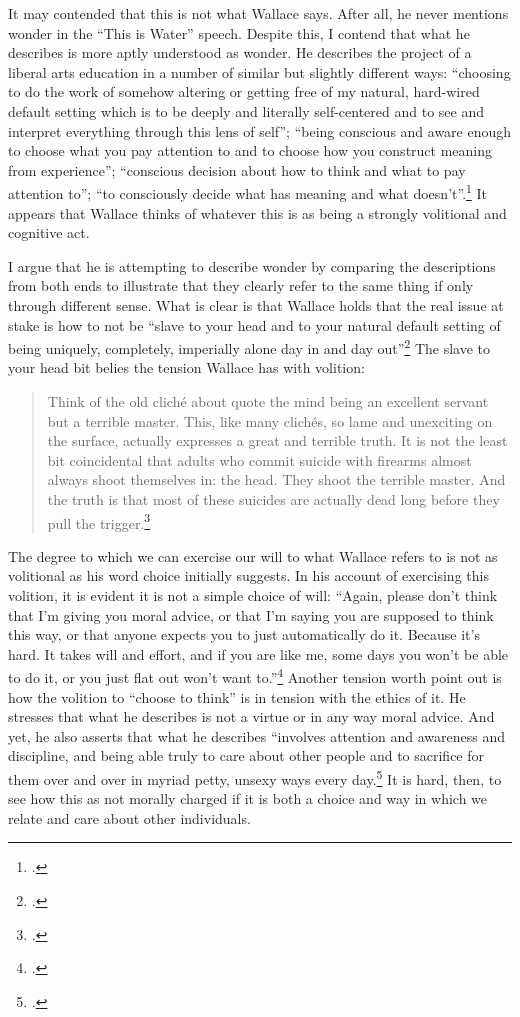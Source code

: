 \documentclass[letterpaper,notitlepage,12pt]{article}
\begin{document}
It may contended that this is not what Wallace says.
After all, he never mentions wonder in the ``This is Water'' speech.
Despite this, I contend that what he describes is more aptly understood as
wonder.
He describes the project of a liberal arts education in a number of similar but
slightly different ways: ``choosing to do the work of somehow altering
or getting free of my natural, hard-wired default setting which is to be
deeply and literally self-centered and to see and interpret everything
through this lens of self''; ``being conscious and aware enough to choose what
you pay attention to and to choose how you construct meaning from experience'';
``conscious decision about how to think and what to pay attention to''; ``to
consciously decide what has meaning and what
doesn't''.\footcite{david_foster_wallace_this_2005}
It appears that Wallace thinks of whatever this is as being a strongly
volitional and cognitive act.

I argue that he is attempting to describe wonder by comparing the descriptions
from both ends to illustrate that they clearly refer to the same thing if only
through different sense.
What is clear is that Wallace holds that the real issue at stake is how to not
be ``slave to your head and to your natural default setting of being uniquely,
completely, imperially alone day in and day
out''\footcite{david_foster_wallace_this_2005}
The slave to your head bit belies the tension Wallace has with volition:
\begin{quotation}
Think of the old clich\'e about quote the mind being an excellent servant but a
terrible master.  This, like many clich\'es, so lame and unexciting on the
surface, actually expresses a great and terrible truth. It is not the least bit
coincidental that adults who commit suicide with firearms almost always shoot
themselves in: the head. They shoot the terrible master. And the truth is that
most of these suicides are actually dead long before they pull the
trigger.\footcite{david_foster_wallace_this_2005}
\end{quotation}
The degree to which we can exercise our will to what Wallace refers to is not as
volitional as his word choice initially suggests.
In his account of exercising this volition, it is evident it is not a simple
choice of will: ``Again, please don't think that I'm giving you moral advice, or
that I'm saying you are supposed to think this way, or that anyone expects you
to just automatically do it. Because it's hard. It takes will and effort, and if
you are like me, some days you won't be able to do it, or you just flat out
won't want to.''\footcite{david_foster_wallace_this_2005}
Another tension worth point out is how the volition to ``choose to think'' is in
tension with the ethics of it.
He stresses that what he describes is not a virtue or in any way moral advice.
And yet, he also asserts that what he describes ``involves attention and
awareness and discipline, and being able truly to care about other people and to
sacrifice for them over and over in myriad petty, unsexy ways every
day.\footcite{david_foster_wallace_this_2005}
It is hard, then, to see how this as not morally charged if it is both a choice
and way in which we relate and care about other individuals.
\end{document}
